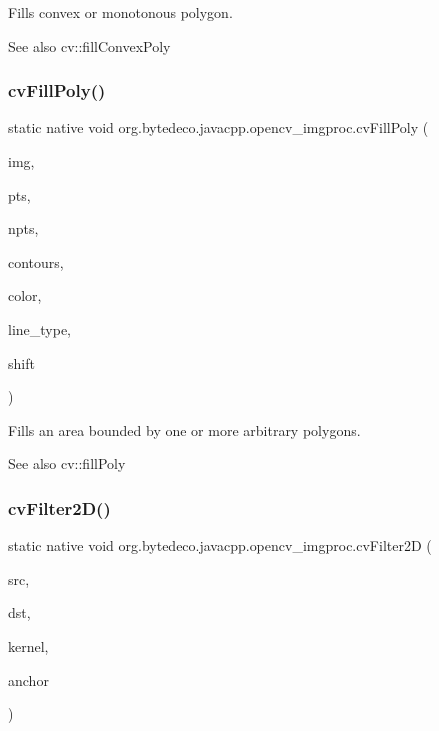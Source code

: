 Fills convex or monotonous polygon. 

\begin{DoxySeeAlso}{See also}
cv\+::fill\+Convex\+Poly 
\end{DoxySeeAlso}
\mbox{\label{group__imgproc__c_gafaa4b2cde022d741d6efd5a6ae9a5ba9}} 
\subsubsection{\texorpdfstring{cv\+Fill\+Poly()}{cvFillPoly()}}
{\footnotesize\ttfamily static native void org.\+bytedeco.\+javacpp.\+opencv\+\_\+imgproc.\+cv\+Fill\+Poly (\begin{DoxyParamCaption}\item[{Cv\+Arr}]{img,  }\item[{@Cast(\char`\"{}Cv\+Point$\ast$$\ast$\char`\"{}) Pointer\+Pointer}]{pts,  }\item[{@Const Int\+Pointer}]{npts,  }\item[{int}]{contours,  }\item[{@By\+Val Cv\+Scalar}]{color,  }\item[{int}]{line\+\_\+type,  }\item[{int}]{shift }\end{DoxyParamCaption})\hspace{0.3cm}{\ttfamily [static]}}



Fills an area bounded by one or more arbitrary polygons. 

\begin{DoxySeeAlso}{See also}
cv\+::fill\+Poly 
\end{DoxySeeAlso}
\mbox{\label{group__imgproc__c_gaeb0ce4259621b5151099fcc7d4c25522}} 
\subsubsection{\texorpdfstring{cv\+Filter2\+D()}{cvFilter2D()}}
{\footnotesize\ttfamily static native void org.\+bytedeco.\+javacpp.\+opencv\+\_\+imgproc.\+cv\+Filter2D (\begin{DoxyParamCaption}\item[{@Const Cv\+Arr}]{src,  }\item[{Cv\+Arr}]{dst,  }\item[{@Const Cv\+Mat}]{kernel,  }\item[{@By\+Val(null\+Value=\char`\"{}Cv\+Point(cv\+Point(-\/1,-\/1))\char`\"{}) Cv\+Point}]{anchor }\end{DoxyParamCaption})\hspace{0.3cm}{\ttfamily [static]}}



